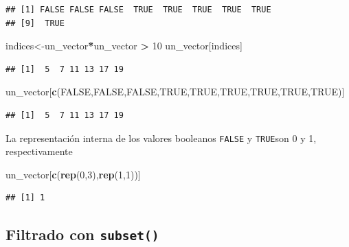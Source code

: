 \documentclass[
]{book}
\newenvironment{Shaded}{\begin{snugshade}}{\end{snugshade}}
\newcommand{\ConstantTok}[1]{\textcolor[rgb]{0.56,0.35,0.01}{#1}}
\newcommand{\DecValTok}[1]{\textcolor[rgb]{0.00,0.00,0.81}{#1}}
\newcommand{\FunctionTok}[1]{\textcolor[rgb]{0.13,0.29,0.53}{\textbf{#1}}}
\newcommand{\NormalTok}[1]{#1}
\newcommand{\OtherTok}[1]{\textcolor[rgb]{0.56,0.35,0.01}{#1}}
\newcommand{\SpecialCharTok}[1]{\textcolor[rgb]{0.81,0.36,0.00}{\textbf{#1}}}
\begin{document}
\begin{verbatim}
## [1] FALSE FALSE FALSE  TRUE  TRUE  TRUE  TRUE  TRUE
## [9]  TRUE
\end{verbatim}

\begin{Shaded}
\begin{Highlighting}[]
\NormalTok{indices}\OtherTok{\textless{}{-}}\NormalTok{un\_vector}\SpecialCharTok{*}\NormalTok{un\_vector }\SpecialCharTok{\textgreater{}} \DecValTok{10} 
\NormalTok{un\_vector[indices]}
\end{Highlighting}
\end{Shaded}

\begin{verbatim}
## [1]  5  7 11 13 17 19
\end{verbatim}

\begin{Shaded}
\begin{Highlighting}[]
\NormalTok{un\_vector[}\FunctionTok{c}\NormalTok{(}\ConstantTok{FALSE}\NormalTok{,}\ConstantTok{FALSE}\NormalTok{,}\ConstantTok{FALSE}\NormalTok{,}\ConstantTok{TRUE}\NormalTok{,}\ConstantTok{TRUE}\NormalTok{,}\ConstantTok{TRUE}\NormalTok{,}\ConstantTok{TRUE}\NormalTok{,}\ConstantTok{TRUE}\NormalTok{,}\ConstantTok{TRUE}\NormalTok{)]}
\end{Highlighting}
\end{Shaded}

\begin{verbatim}
## [1]  5  7 11 13 17 19
\end{verbatim}

La representación interna de los valores booleanos \texttt{FALSE} y \texttt{TRUE}son 0 y 1, respectivamente

\begin{Shaded}
\begin{Highlighting}[]
\NormalTok{un\_vector[}\FunctionTok{c}\NormalTok{(}\FunctionTok{rep}\NormalTok{(}\DecValTok{0}\NormalTok{,}\DecValTok{3}\NormalTok{),}\FunctionTok{rep}\NormalTok{(}\DecValTok{1}\NormalTok{,}\DecValTok{1}\NormalTok{))]}
\end{Highlighting}
\end{Shaded}

\begin{verbatim}
## [1] 1
\end{verbatim}

\subsection{\texorpdfstring{Filtrado con \texttt{subset()}}{Filtrado con subset()}}\label{filtrado-con-subset}
\end{document}
